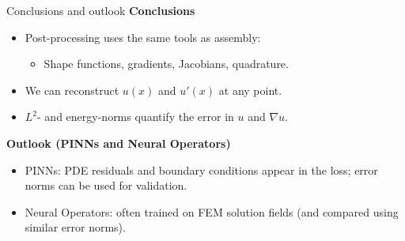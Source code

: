 \documentclass{beamer}
\begin{document}
	
	\begin{frame}{Conclusions and outlook}
			\small
			\textbf{Conclusions}
			\footnotesize
			\begin{itemize}
				\item Post-processing uses the same tools as assembly:
				
				\begin{itemize}
					\item[-] \footnotesize Shape functions, gradients, Jacobians, quadrature.
				\end{itemize}
				\item We can reconstruct $u(x)$ and $u'(x)$ at any point.
				\item $L^2$- and energy-norms quantify the error in $u$ and $\nabla u$.
			\end{itemize}
			
			\vspace{4pt}
			\small
			\textbf{Outlook (PINNs and Neural Operators)}
			\footnotesize
			\begin{itemize}
				\item PINNs: PDE residuals and boundary conditions appear in the loss;
				error norms can be used for validation.
				\item Neural Operators: often trained on FEM solution fields
				(and compared using similar error norms).
			\end{itemize}
	\end{frame}
	
\end{document}
